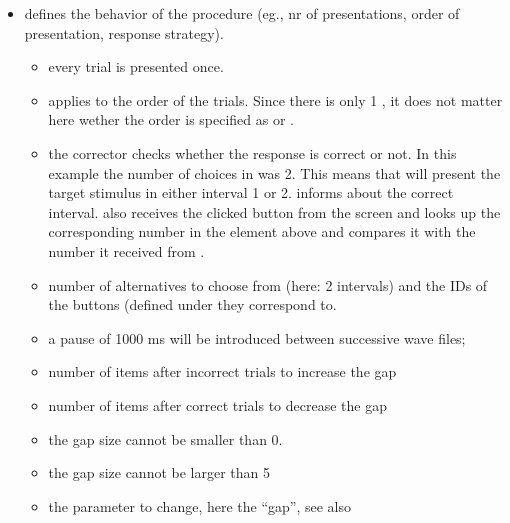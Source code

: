 \begin{itemize}
\item {} defines the behavior of the procedure
(eg., nr of presentations, order of presentation, response
strategy).

\begin{itemize}
\item {} every trial is presented once.

\item {} applies to the order of the trials. Since there is only 1
, it does not matter here wether the order is
specified as  or .

\item {} the corrector checks whether the
response is correct or not. In this example the number of choices
in  was 2. This means that 
will present the target stimulus in either interval 1 or 2.
 informs  about the correct
interval.  also receives the clicked button from the
screen and looks up the corresponding number in the
 element above and compares it with the number it
received from . 

\item {} number of alternatives to choose from
(here: 2 intervals) and the IDs of the buttons (defined under  they correspond to.

\item {} a pause of 1000 ms will be
introduced between successive wave files;

\item {} number of items after incorrect trials to
increase the gap

\item {} number of items after correct trials to
decrease the gap

\item {} the gap size cannot be smaller than 0.

 \item {} the gap size cannot be larger than 5

\item {} the parameter to change, here the
``gap'', see also 


\end{itemize}
\end{itemize}
